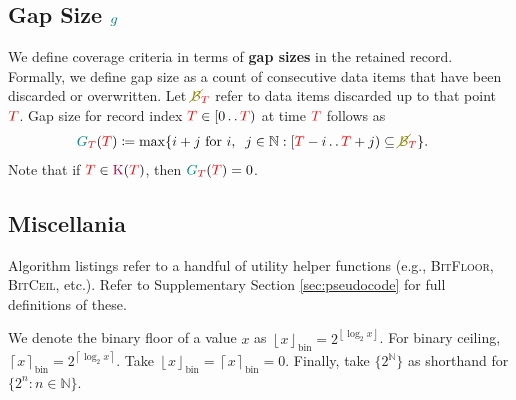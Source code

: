 \subsection{Gap Size $\colorg$}
\label{sec:notation-gapsize}

We define coverage criteria in terms of \textbf{gap sizes} in the retained record.
Formally, we define gap size as a count of consecutive data items that have been discarded or overwritten.
Let $\colorBnot_{\colorT}$ refer to data items discarded up to that point $\colorT$.
Gap size for record index $\colorTbar \in [0 \twodots \colorT)$ at time $\colorT$ follows as
\begin{align}
\colorG_{\colorT}(\colorTbar)
&\coloneq
\max
\{
  i + j
  \text{ for }
  i,\;\; j \in \mathbb{N}
  :
  [\colorTbar-i \twodots \colorTbar+j) \subseteq \colorBnot_{\colorT}
\}.
\label{eqn:gap-size-defn}
\end{align}
Note that if $\colorTbar \in \colorK(\colorT)$, then $\colorG_{\colorT}(\colorTbar) = 0$.

\subsection{Miscellania}

Algorithm listings refer to a handful of utility helper functions (e.g., \textsc{BitFloor}, \textsc{BitCeil}, etc.).
Refer to Supplementary Section \ref{sec:pseudocode} for full definitions of these.

We denote the binary floor of a value $x$ as $\left\lfloor x \right\rfloor_\mathrm{bin} = 2^{\left\lfloor \log_2 x \right\rfloor}$.
For binary ceiling, $\left\lceil x \right\rceil_\mathrm{bin} = 2^{\left\lceil \log_2 x \right\rceil}$.
Take $\left\lfloor x \right\rfloor_\mathrm{bin} = \left\lceil x \right\rceil_\mathrm{bin} = 0$.
Finally, take $\{2^{\mathbb{N}}\}$ as shorthand for $\{2^n : n \in \mathbb{N} \}$.
